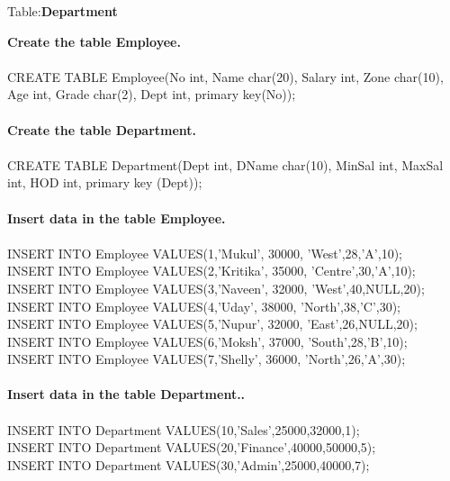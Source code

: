 \documentclass[
a4paper]{article}
\begin{document}
\begin{large}
\begin{center}
			Table:\textbf{Department}
			\vspace{0.5cm}
		\end{center}
		\textbf{Create the table Employee.}\\
		\\
	CREATE TABLE Employee(No int, Name char(20), Salary int, Zone char(10), Age int, Grade char(2), Dept int, primary key(No));\\\textbf{}
		\\				
\textbf{Create the table Department.}\\
  \\
  CREATE TABLE Department(Dept int, DName char(10), MinSal int, MaxSal int, HOD int, primary key (Dept));\\
\\
        \textbf{Insert data in the table Employee.}\\
        \\
INSERT INTO Employee VALUES(1,'Mukul', 30000, 'West',28,'A',10);\vspace{0.2cm}\\
	INSERT INTO Employee VALUES(2,'Kritika', 35000, 'Centre',30,'A',10);\vspace{0.2cm}\\
	INSERT INTO Employee VALUES(3,'Naveen', 32000, 'West',40,NULL,20);\vspace{0.2cm}\\
	INSERT INTO Employee VALUES(4,'Uday', 38000, 'North',38,'C',30);\vspace{0.2cm}\\
	INSERT INTO Employee VALUES(5,'Nupur', 32000, 'East',26,NULL,20);\vspace{0.2cm}\\
	INSERT INTO Employee VALUES(6,'Moksh', 37000, 'South',28,'B',10);\vspace{0.2cm}\\
	INSERT INTO Employee VALUES(7,'Shelly', 36000, 'North',26,'A',30);\\
		\\
		\textbf{Insert data in the table Department..}\\
		\\
  INSERT INTO Department VALUES(10,'Sales',25000,32000,1);\vspace{0.2cm}\\
	INSERT INTO Department VALUES(20,'Finance',40000,50000,5);\vspace{0.2cm}\\
	INSERT INTO Department VALUES(30,'Admin',25000,40000,7);\\

\end{large}
\end{document}
